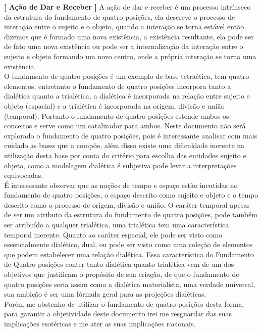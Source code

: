 \documentclass[10pt,a4paper]{report}
\begin{document}
\textbf{[ Ação de Dar e Receber ]} A ação de dar e receber é um processo intrínseco da estrutura do fundamento de quatro posições, ela descreve o processo de interação entre o sujeito e o objeto, quando a interação se torna estável então dizemos que é formado uma nova existência, a existência resultante, ela pode ser de fato uma nova existência ou pode ser a internalização da interação entre o sujeito e objeto formando um novo centro, onde a própria interação se torna uma existência.\\

O fundamento de quatro posições é um exemplo de base tetraética, tem quatro elementos, entretanto o fundamento de quatro posições incorpora tanto a dialética quanto a trialética, a dialética é incorporada na relação entre sujeito e objeto (espacial) e a trialética é incorporada na origem, divisão e união (temporal). Portanto o fundamento de quatro posições estende ambos os conceitos e serve como um catalizador para ambos. Neste documento não será explorado o fundamento de quatro posições, pois é interessante analisar com mais cuidado as bases que a compõe, além disso existe uma dificuldade inerente na utilização desta base por conta do critério para escolha das entidades sujeito e objeto, como a modelagem dialética é subjetiva pode levar a interpretações equivocadas.\\ 

É interessante observar que as noções de tempo e espaço estão incutidas no fundamento de quatro posições, o espaço descrito como sujeito e objeto e o tempo descrito como o processo de origem, divisão e união. O caráter temporal apesar de ser um atributo da estrutura do fundamento de quatro posições, pode também ser atribuído a qualquer trialética, uma trialética tem uma característica temporal inerente. Quanto ao caráter espacial, ele pode ser visto como essencialmente dialético, dual, ou pode ser visto como uma coleção de elementos que podem estabelecer uma relação dialética. Essa característica do Fundamento de Quatro posições conter tanto dialética quanto trialética vem de um dos objetivos que justificam o propósito de sua criação, de que o fundamento de quatro posições seria assim como a dialética materialista, uma verdade universal, sua ambição é ser uma fórmula geral para as projeções dialéticas.\\

Porém me abstenho de utilizar o fundamento de quatro posições desta forma, para garantir a objetividade deste documento irei me resguardar das suas implicações esotéricas e me ater as suas implicações racionais.
\end{document}
